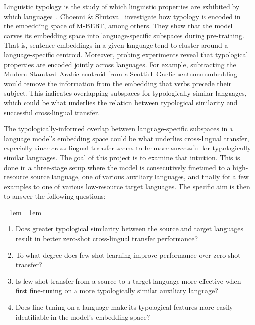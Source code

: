 	Linguistic typology is the study of which linguistic properties are exhibited by which languages~\cite{croft-2002-typology}. Choenni \& Shutova~\cite{choenni-shutova-2022-investigating} investigate how typology is encoded in the embedding space of M-BERT, among others. They show that the model carves its embedding space into language-specific subspaces during pre-training. That is, sentence embeddings in a given language tend to cluster around a language-specific centroid. Moreover, probing experiments reveal that typological properties are encoded jointly across languages. For example, subtracting the Modern Standard Arabic centroid from a Scottish Gaelic sentence embedding would remove the information from the embedding that verbs precede their subject. This indicates overlapping subspaces for typologically similar languages, which could be what underlies the relation between typological similarity and successful cross-lingual transfer.

	The typologically-informed overlap between language-specific subspaces in a language model's embedding space could be what underlies cross-lingual transfer, especially since cross-lingual transfer seems to be more successful for typologically similar languages. The goal of this project is to examine that intuition. This is done in a three-stage setup where the model is consecutively finetuned to a high-resource source language, one of various auxiliary languages, and finally for a few examples to one of various low-resource target languages. The specific aim is then to answer the following questions:

	\begin{list}{}{\leftmargin=1em \rightmargin=1em}
		\item
		\begin{enumerate}[label=\textbf{Q\arabic*:}, leftmargin=*, align=left]
		    \item Does greater typological similarity between the source and target languages result in better zero-shot cross-lingual transfer performance?
		    \item To what degree does few-shot learning improve performance over zero-shot transfer?
		    \item Is few-shot transfer from a source to a target language more effective when first fine-tuning on a more typologically similar auxiliary language?
		    \item Does fine-tuning on a language make its typological features more easily identifiable in the model's embedding space?
		\end{enumerate}
	\end{list}

